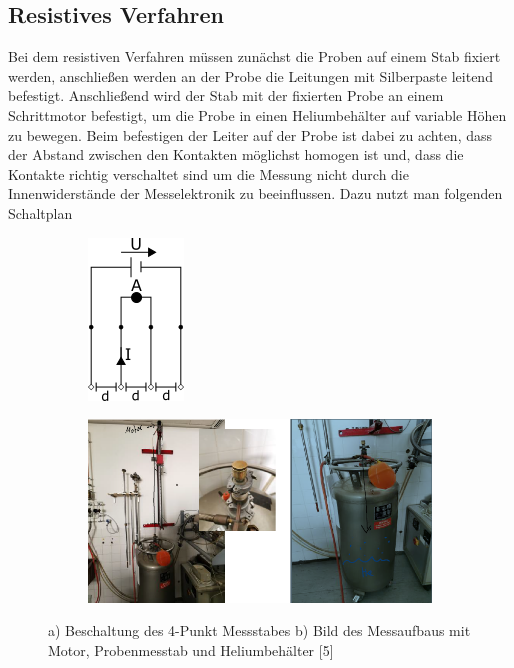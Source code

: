     \subsection*{Resistives Verfahren}
    Bei dem resistiven Verfahren müssen zunächst die Proben auf einem Stab fixiert werden, anschließen werden
    an der Probe die Leitungen mit Silberpaste leitend befestigt. Anschließend wird der Stab mit der fixierten
    Probe an einem Schrittmotor befestigt, um die Probe in einen Heliumbehälter auf variable Höhen zu bewegen.
    Beim befestigen der Leiter auf der Probe ist dabei zu achten, dass der Abstand zwischen den Kontakten möglichst
    homogen ist und, dass die Kontakte richtig verschaltet sind um die Messung nicht durch die Innenwiderstände
    der Messelektronik zu beeinflussen. Dazu nutzt man folgenden Schaltplan
    \begin{figure}[H]
        \centering
        \begin{subfigure}{.5\textwidth}
        \centering
        \includegraphics[width=.4\linewidth]{images/schaltplan.png}
        \caption{}
        \label{fig:sub11}
        \end{subfigure}%
        \begin{subfigure}{.5\textwidth}
        \centering
        \includegraphics[width=.8\linewidth]{images/aufbaures.png}
        \caption{}
        \label{fig:sub22}
        \end{subfigure} 
        \caption{a) Beschaltung des 4-Punkt Messstabes b) Bild des Messaufbaus mit Motor, Probenmesstab und Heliumbehälter [5]}
        \label{fig:test1}
    \end{figure}


